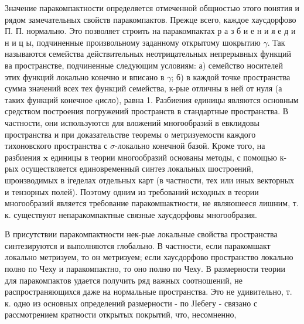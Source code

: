 \documentclass[10pt]{article}
\begin{document}
Значение паракомпактности определяется отмеченной общностью этого понятия и рядом замечательных свойств паракомпактов. Прежце всего, каждое хаусдорфово П. П. нормально. Это позволяет строить на паракомпактах р а з б и е н и я е д и н и ц ы, подчиненные произвольному заданному открытому шокрытию $\gamma$. Так называются семейства действительных неотрицательных непрерывных функций ва пространстве, подчиненные следующим условиям: а) семейство носителей этих функций локально конечно и вписано в $\gamma$; б) в каждой точке пространства сумма значений всех тех функций семейства, к-рые отличны в ней от нуля (а таких функций конечное qисло), равна 1. Разбиения единицы являются основным средством построения погружений пространств в стандартные пространства. В частности, они используются для вложений многообразий в евклидовы пространства и при доказательстве теоремы о метризуемости каждого тихоновского пространства с $\sigma$-локально конечной базой. Кроме того, на разбиения $\mathbf{x}$ единицы в теории многообразий основаны методы, с помощью к-рых осуществляется единовременный синтез локальных шостроений, шроизводимых в ігеделах отдельных карт (в частности, тех или иных векторных и тензорных полей). Поэтому одним из требований исходных в теории многообразий является требование паракомшактности, не являюшееся лишним, т. к. существуют непаракомпактные связные хаусдорфовы многообразия.

В присутствии паракомпактности нек-рые локальные свойства пространства синтезируются и выполняются глобально. В частности, если паракомшакт локально метризуем, то он метризуем; если хаусдорфово пространство локально полно по Чеху и паракомпактно, то оно полно по Чеху. В размерности теории для паракомпактов удается получить ряд важных соотношений, не распространяющихся даже на нормальные пространства. Это не удивительно, т. к. одно из основных определений размерности - по ЈІебегу - связано с рассмотрением кратности открытых покрытий, что, несомненно,
\end{document}
